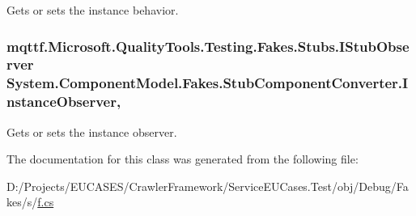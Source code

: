 Gets or sets the instance behavior.

\hypertarget{class_system_1_1_component_model_1_1_fakes_1_1_stub_component_converter_aaf601988e0c11f539d35ef64bed54a14}{
\subsubsection[{Instance\-Observer}]{\setlength{\rightskip}{0pt plus 5cm}mqttf.\-Microsoft.\-Quality\-Tools.\-Testing.\-Fakes.\-Stubs.\-I\-Stub\-Observer System.\-Component\-Model.\-Fakes.\-Stub\-Component\-Converter.\-Instance\-Observer\hspace{0.3cm}{\ttfamily [get]}, {\ttfamily [set]}}}\label{class_system_1_1_component_model_1_1_fakes_1_1_stub_component_converter_aaf601988e0c11f539d35ef64bed54a14}


Gets or sets the instance observer.



The documentation for this class was generated from the following file\-:\begin{DoxyCompactItemize}
\item 
D\-:/\-Projects/\-E\-U\-C\-A\-S\-E\-S/\-Crawler\-Framework/\-Service\-E\-U\-Cases.\-Test/obj/\-Debug/\-Fakes/s/\hyperlink{s_2f_8cs}{f.\-cs}\end{DoxyCompactItemize}
